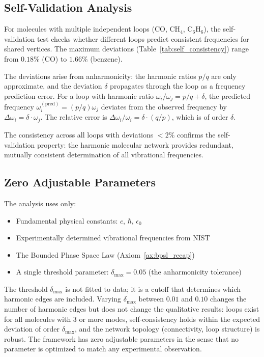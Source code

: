 \documentclass[11pt,a4paper]{article}
\theoremstyle{definition}
\theoremstyle{remark}
\begin{document}
\subsection{Self-Validation Analysis}

For molecules with multiple independent loops (CO, CH$_4$, C$_6$H$_6$), the self-validation test checks whether different loops predict consistent frequencies for shared vertices. The maximum deviations (Table~\ref{tab:self_consistency}) range from $0.18\%$ (CO) to $1.66\%$ (benzene).

The deviations arise from anharmonicity: the harmonic ratios $p/q$ are only approximate, and the deviation $\delta$ propagates through the loop as a frequency prediction error. For a loop with harmonic ratio $\omega_i/\omega_j = p/q + \delta$, the predicted frequency $\omega_i^{(\mathrm{pred})} = (p/q) \omega_j$ deviates from the observed frequency by $\Delta\omega_i = \delta \cdot \omega_j$. The relative error is $\Delta\omega_i/\omega_i = \delta \cdot (q/p)$, which is of order $\delta$.

The consistency across all loops with deviations $< 2\%$ confirms the self-validation property: the harmonic molecular network provides redundant, mutually consistent determination of all vibrational frequencies.

\subsection{Zero Adjustable Parameters}

The analysis uses only:
\begin{itemize}[nosep]
\item Fundamental physical constants: $c$, $\hbar$, $\epsilon_0$
\item Experimentally determined vibrational frequencies from NIST
\item The Bounded Phase Space Law (Axiom~\ref{ax:bpsl_recap})
\item A single threshold parameter: $\delta_{\max} = 0.05$ (the anharmonicity tolerance)
\end{itemize}

The threshold $\delta_{\max}$ is not fitted to data; it is a cutoff that determines which harmonic edges are included. Varying $\delta_{\max}$ between $0.01$ and $0.10$ changes the number of harmonic edges but does not change the qualitative results: loops exist for all molecules with 3 or more modes, self-consistency holds within the expected deviation of order $\delta_{\max}$, and the network topology (connectivity, loop structure) is robust. The framework has zero adjustable parameters in the sense that no parameter is optimized to match any experimental observation.
\end{document}
